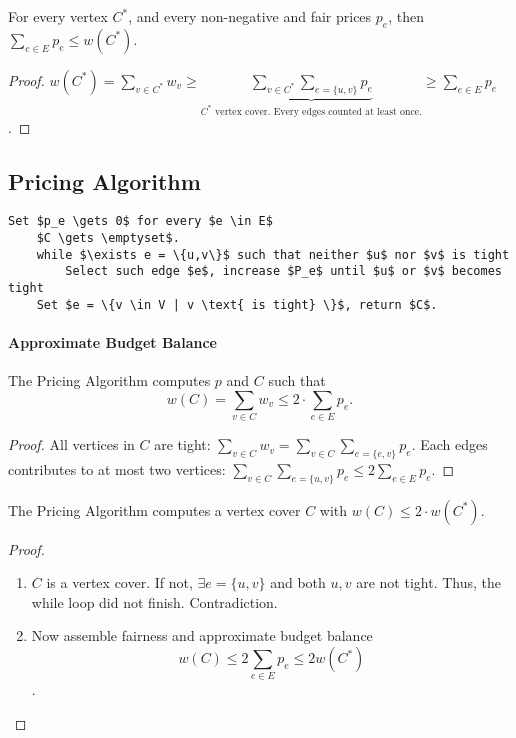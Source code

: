 \begin{mylemma}
For every vertex $C^*$, and every non-negative and fair prices $p_e$, then $\sum_{e \in E} p_e \le w(C^*)$.
\end{mylemma}
\begin{proof}
$w(C^*) = \sum\limits_{v \in C^*} w_v \ge \underbrace{\sum\limits_{v \in C^*} \sum\limits_{e = \{u,v\}} p_e}_\text{$C^*$ vertex cover. Every edges counted at least once.} \ge \sum\limits_{e \in E} p_e$.
\end{proof}

\subsection{Pricing Algorithm}

\begin{lstlisting}[mathescape]
    Set $p_e \gets 0$ for every $e \in E$
    $C \gets \emptyset$.
    while $\exists e = \{u,v\}$ such that neither $u$ nor $v$ is tight
        Select such edge $e$, increase $P_e$ until $u$ or $v$ becomes tight
    Set $e = \{v \in V | v \text{ is tight} \}$, return $C$.
\end{lstlisting}

\paragraph{Approximate Budget Balance}

\begin{mylemma}
The Pricing Algorithm computes $p$ and $C$ such that
$$w(C) = \sum\limits_{v \in C} w_v \le 2 \cdot \sum\limits_{e \in E} p_e.$$
\end{mylemma}
\begin{proof}
All vertices in $C$ are tight: $\sum\limits_{v \in C} w_v = \sum\limits_{v \in C} \sum\limits_{e = \{e,v\}} p_e$. Each edges contributes to at most two vertices: $\sum\limits_{v \in C} \sum\limits_{e = \{u,v\}} p_e \le 2 \sum\limits_{e \in E} p_e$.
\end{proof}

\begin{mytheorem}
The Pricing Algorithm computes a vertex cover $C$ with $w(C) \le 2 \cdot w(C^*)$.
\end{mytheorem}
\begin{proof}
\begin{enumerate}
\item $C$ is a vertex cover. If not, $\exists e = \{u,v\}$ and both $u,v$ are not tight. Thus, the while loop did not finish. Contradiction.
\item Now assemble fairness and approximate budget balance
$$w(C) \le 2 \sum\limits_{e \in E} p_e \le 2 w(C^*)$$.
\end{enumerate}
\end{proof}


